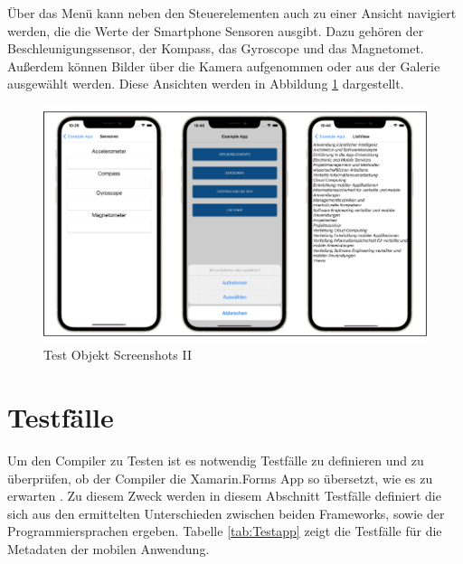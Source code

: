 Über das Menü kann neben den Steuerelementen auch zu einer Ansicht navigiert werden,  die die Werte der Smartphone Sensoren ausgibt.  Dazu gehören der Beschleunigungssensor,  der Kompass,  das Gyroscope und das Magnetomet. Außerdem können Bilder über die Kamera aufgenommen oder aus der Galerie ausgewählt werden.  Diese Ansichten werden in Abbildung \ref{fig:TestObjectII} dargestellt.

\begin{figure}[!ht]
 \includegraphics[width=\textwidth,keepaspectratio]{Images/Screenshot/Sensors.png}
 \caption{Test Objekt Screenshots II}
 \label{fig:TestObjectII}
\end{figure}


\section{Testfälle}
Um den Compiler zu Testen ist es notwendig Testfälle zu definieren und zu überprüfen, ob der Compiler die Xamarin.Forms App so übersetzt, wie es zu erwarten .   Zu diesem Zweck werden in diesem Abschnitt Testfälle definiert die sich aus den ermittelten Unterschieden zwischen beiden Frameworks,  sowie der Programmiersprachen ergeben.  Tabelle \ref{tab:Testapp} zeigt die Testfälle für die Metadaten der mobilen Anwendung. 

